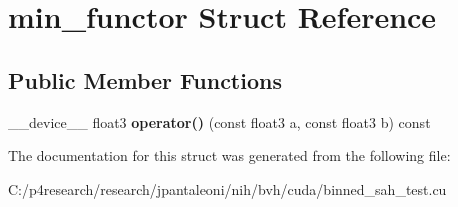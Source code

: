 \hypertarget{structmin__functor}{
\section{min\-\_\-functor \-Struct \-Reference}
\label{structmin__functor}
}
\subsection*{\-Public \-Member \-Functions}
\begin{DoxyCompactItemize}
\item 
\hypertarget{structmin__functor_af2ab665d5e7fff75fa72a575037a2435}{
\-\_\-\-\_\-device\-\_\-\-\_\- float3 {\bfseries operator()} (const float3 a, const float3 b) const }
\label{structmin__functor_af2ab665d5e7fff75fa72a575037a2435}

\end{DoxyCompactItemize}


\-The documentation for this struct was generated from the following file\-:\begin{DoxyCompactItemize}
\item 
\-C\-:/p4research/research/jpantaleoni/nih/bvh/cuda/binned\-\_\-sah\-\_\-test.\-cu\end{DoxyCompactItemize}

